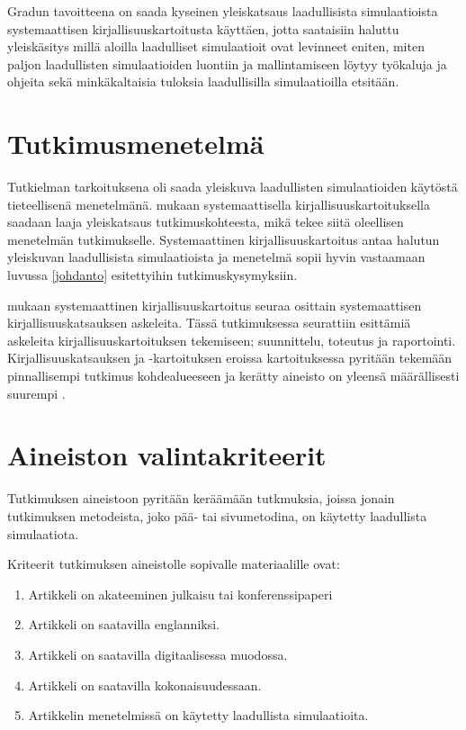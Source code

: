 \documentclass[utf8]{gradu3}
\begin{document}
Gradun tavoitteena on saada kyseinen yleiskatsaus laadullisista simulaatioista systemaattisen kirjallisuuskartoitusta käyttäen, jotta saataisiin haluttu yleiskäsitys millä aloilla laadulliset simulaatioit ovat levinneet eniten, miten paljon laadullisten simulaatioiden luontiin ja mallintamiseen löytyy työkaluja ja ohjeita sekä minkäkaltaisia tuloksia laadullisilla simulaatioilla etsitään.

\section{Tutkimusmenetelmä} \label{tutkimusmenetelmä}
Tutkielman tarkoituksena oli saada yleiskuva laadullisten simulaatioiden käytöstä
tieteellisenä menetelmänä.
\textcite{keele2007guidelines} mukaan  systemaattisella kirjallisuuskartoituksella saadaan laaja yleiskatsaus tutkimuskohteesta,
mikä tekee siitä oleellisen menetelmän tutkimukselle. 
Systemaattinen kirjallisuuskartoitus antaa halutun yleiskuvan laadullisista simulaatioista ja menetelmä sopii hyvin vastaamaan luvussa \ref{johdanto} esitettyihin tutkimuskysymyksiin.

\textcite{keele2007guidelines} mukaan systemaattinen kirjallisuuskartoitus seuraa
osittain systemaattisen kirjallisuuskatsauksen askeleita.
Tässä tutkimuksessa seurattiin \textcite{keele2007guidelines} esittämiä askeleita kirjallisuuskartoituksen tekemiseen; suunnittelu, toteutus ja raportointi.
Kirjallisuuskatsauksen ja -kartoituksen eroissa kartoituksessa pyritään tekemään 
pinnallisempi tutkimus kohdealueeseen ja kerätty aineisto on 
yleensä määrällisesti suurempi \parencite{keele2007guidelines}.

\section{Aineiston valintakriteerit} \label{valintakriteerit}
Tutkimuksen aineistoon pyritään keräämään tutkmuksia, joissa jonain tutkimuksen metodeista, joko pää- tai sivumetodina, on käytetty laadullista simulaatiota.

Kriteerit tutkimuksen aineistolle sopivalle materiaalille ovat:
\begin{enumerate}
    \item Artikkeli on akateeminen julkaisu tai konferenssipaperi
    \item Artikkeli on saatavilla englanniksi.
    \item Artikkeli on saatavilla digitaalisessa muodossa.
    \item Artikkeli on saatavilla kokonaisuudessaan.
    \item Artikkelin menetelmissä on käytetty laadullista simulaatioita.
\end{enumerate}
\end{document}
